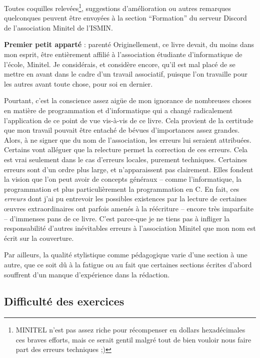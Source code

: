 \documentclass[../main.tex]{subfiles}
\begin{document}
Toutes coquilles relevées\footnote{MINITEL n'est pas assez riche pour récompenser en dollars hexadécimales ces braves efforts, mais ce serait gentil malgré tout de bien vouloir nous faire part des erreurs techniques ;)}, suggestions d'amélioration ou autres remarques quelconques peuvent être envoyées à la section ``Formation'' du serveur Discord de l'association Minitel de l'ISMIN.

\begin{minitelbasicbox}{\textbf{Premier petit apparté} : parenté}
Originellement, ce livre devait, du moins dans mon esprit, être entièrement affilié à l'association étudiante d'informatique de l'école, Minitel. Je considérais, et considère encore, qu'il est mal placé de se mettre en avant dans le cadre d'un travail associatif, puisque l'on travaille pour les autres avant toute chose, pour soi en dernier.

Pourtant, c'est la conscience assez aigüe de mon ignorance de nombreuses choses en matière de programmation et d'informatique qui a changé radicalement l'application de ce point de vue vis-à-vis de ce livre. Cela provient de la certitude que mon travail pouvait être entaché de bévues d'importances assez grandes. Alors, à ne signer que du nom de l'association, les erreurs lui seraient attribuées. Certains vont alléguer que la relecture permet la correction de ces erreurs. Cela est vrai seulement dans le cas d'erreurs locales, purement techniques. Certaines erreurs sont d'un ordre plus large, et n'apparaissent pas clairement. Elles fondent la vision que l'on peut avoir de concepts généraux -- comme l'informatique, la programmation et plus particulièrement la programmation en C. En fait, ces \textit{erreurs} dont j'ai pu entrevoir les possibles existences par la lecture de certaines \oe{}uvres extraordinaires \cite{EoP}\cite{TAOCP} ont parfois amenés à la réécriture -- encore très imparfaite -- d'immenses pans de ce livre. C'est parce-que je ne tiens pas à infliger la responsabilité d'autres inévitables erreurs à l'association Minitel que mon nom est écrit sur la couverture.

Par ailleurs, la qualité stylistique comme pédagogique varie d'une section à une autre, que ce soit dû à la fatigue ou au fait que certaines sections écrites d'abord souffrent d'un manque d'expérience dans la rédaction.
\end{minitelbasicbox}

\hrulefill

\subsection*{Difficulté des exercices}
\end{document}
